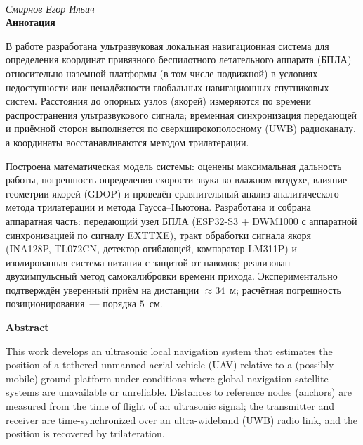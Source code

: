 \begin{center}
    \large{} \\[0.3cm]
    \large\textit{Смирнов Егор Ильич} \\[1cm]
    \textbf{Аннотация}
\end{center}

\vspace{0.5cm}

В работе разработана ультразвуковая локальная навигационная система для
определения координат привязного беспилотного летательного аппарата (БПЛА)
относительно наземной платформы (в том числе подвижной) в условиях
недоступности или ненадёжности глобальных навигационных спутниковых систем.
Расстояния до опорных узлов (якорей) измеряются по времени распространения
ультразвукового сигнала; временная синхронизация передающей и приёмной сторон
выполняется по сверхширокополосному (UWB) радиоканалу, а координаты
восстанавливаются методом трилатерации.

Построена математическая модель системы: оценены максимальная дальность работы,
погрешность определения скорости звука во влажном воздухе, влияние геометрии
якорей (GDOP) и проведён сравнительный анализ аналитического метода трилатерации
и метода Гаусса--Ньютона. Разработана и собрана аппаратная часть: передающий узел
БПЛА (ESP32-S3 + DWM1000 с аппаратной синхронизацией по сигналу EXTTXE), тракт
обработки сигнала якоря (INA128P, TL072CN, детектор огибающей, компаратор LM311P) и
изолированная система питания с защитой от наводок; реализован двухимпульсный метод
самокалибровки времени прихода. Экспериментально подтверждён уверенный приём на дистанции
${\approx}34$~м; расчётная погрешность позиционирования~--- порядка $5$~см.

\newpage

\begin{center}
    \textbf{Abstract}
\end{center}

\vspace{0.5cm}

This work develops an ultrasonic local navigation system that estimates the
position of a tethered unmanned aerial vehicle (UAV) relative to a (possibly
mobile) ground platform under conditions where global navigation satellite
systems are unavailable or unreliable. Distances to reference nodes (anchors)
are measured from the time of flight of an ultrasonic signal; the transmitter
and receiver are time-synchronized over an ultra-wideband (UWB) radio link, and
the position is recovered by trilateration.


